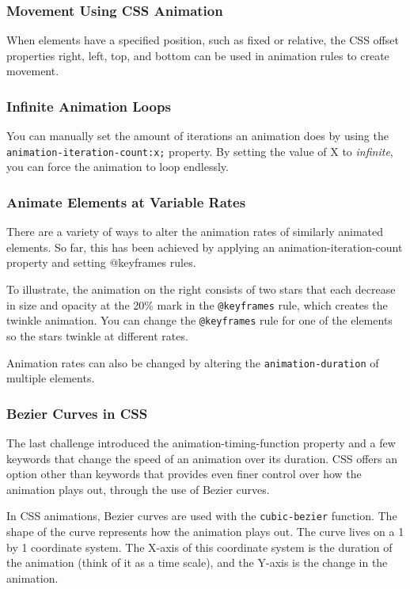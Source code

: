 \subsubsection{Movement Using CSS Animation}
When elements have a specified position, such as fixed or relative, the CSS offset properties right, left, top, and bottom can be used in animation rules to create movement.

\subsubsection{Infinite Animation Loops}

You can manually set the amount of iterations an animation does by using the \texttt{animation-iteration-count:x;} property. By setting the value of X to \emph{infinite}, you can force the animation to loop endlessly.

\subsubsection{Animate Elements at Variable Rates}


There are a variety of ways to alter the animation rates of similarly animated elements. So far, this has been achieved by applying an animation-iteration-count property and setting @keyframes rules.

To illustrate, the animation on the right consists of two stars that each decrease in size and opacity at the 20\% mark in the \texttt{@keyframes} rule, which creates the twinkle animation. You can change the \texttt{@keyframes} rule for one of the elements so the stars twinkle at different rates.

Animation rates can also be changed by altering the \texttt{animation-duration} of multiple elements.

\subsubsection{Bezier Curves in CSS}


The last challenge introduced the animation-timing-function property and a few keywords that change the speed of an animation over its duration. CSS offers an option other than keywords that provides even finer control over how the animation plays out, through the use of Bezier curves.

In CSS animations, Bezier curves are used with the \texttt{cubic-bezier} function. The shape of the curve represents how the animation plays out. The curve lives on a 1 by 1 coordinate system. The X-axis of this coordinate system is the duration of the animation (think of it as a time scale), and the Y-axis is the change in the animation.

